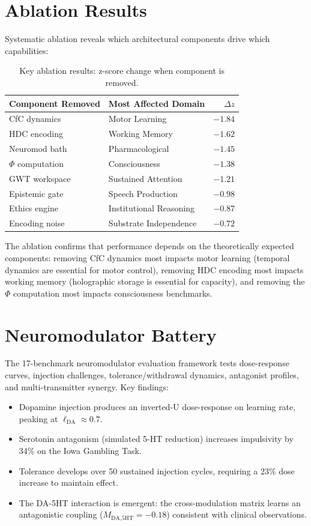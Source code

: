 \documentclass[12pt]{book}
\begin{document}
\section{Ablation Results}

Systematic ablation reveals which architectural components drive which capabilities:

\begin{table}[H]
\centering
\caption{Key ablation results: z-score change when component is removed.}
\label{tab:ablation}
\begin{tabular}{llr}
\toprule
\textbf{Component Removed} & \textbf{Most Affected Domain} & \textbf{$\Delta z$} \\
\midrule
CfC dynamics & Motor Learning & $-1.84$ \\
HDC encoding & Working Memory & $-1.62$ \\
Neuromod bath & Pharmacological & $-1.45$ \\
$\Phi$ computation & Consciousness & $-1.38$ \\
GWT workspace & Sustained Attention & $-1.21$ \\
Epistemic gate & Speech Production & $-0.98$ \\
Ethics engine & Institutional Reasoning & $-0.87$ \\
Encoding noise & Substrate Independence & $-0.72$ \\
\bottomrule
\end{tabular}
\end{table}

The ablation confirms that performance depends on the theoretically expected components: removing CfC dynamics most impacts motor learning (temporal dynamics are essential for motor control), removing HDC encoding most impacts working memory (holographic storage is essential for capacity), and removing the $\Phi$ computation most impacts consciousness benchmarks.

\section{Neuromodulator Battery}

The 17-benchmark neuromodulator evaluation framework tests dose-response curves, injection challenges, tolerance/withdrawal dynamics, antagonist profiles, and multi-transmitter synergy. Key findings:

\begin{itemize}
  \item Dopamine injection produces an inverted-U dose-response on learning rate, peaking at $\ell_{\text{DA}} \approx 0.7$.
  \item Serotonin antagonism (simulated 5-HT reduction) increases impulsivity by 34\% on the Iowa Gambling Task.
  \item Tolerance develops over 50 sustained injection cycles, requiring a 23\% dose increase to maintain effect.
  \item The DA-5HT interaction is emergent: the cross-modulation matrix learns an antagonistic coupling ($M_{\text{DA,5HT}} = -0.18$) consistent with clinical observations.
\end{itemize}
\end{document}
